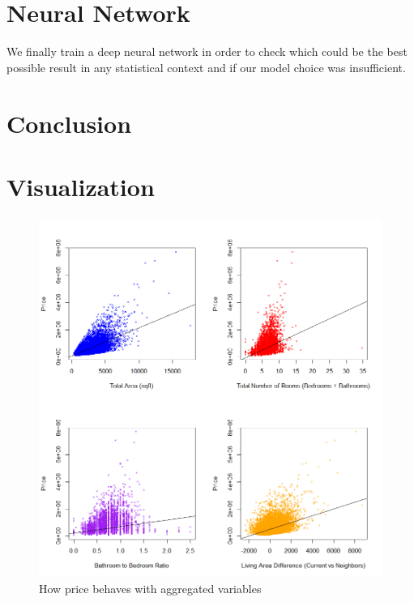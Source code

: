 \documentclass[a4paper, 9pt]{article}
\begin{document}
\begin{multicols}{2}
\section{Neural Network} \vspace{-7pt}
We finally train a deep neural network in order to check which could be the best possible result in any statistical context and if our model choice was insufficient.

\section{Conclusion} \vspace{-7pt}
\noindent

\end{multicols}


\pagebreak
\appendix

\section{Visualization}
\begin{figure}[h]
\includegraphics[scale=0.6]{corrplots}
\centering
\caption{How price behaves with aggregated variables}
\end{figure}
\end{document}
